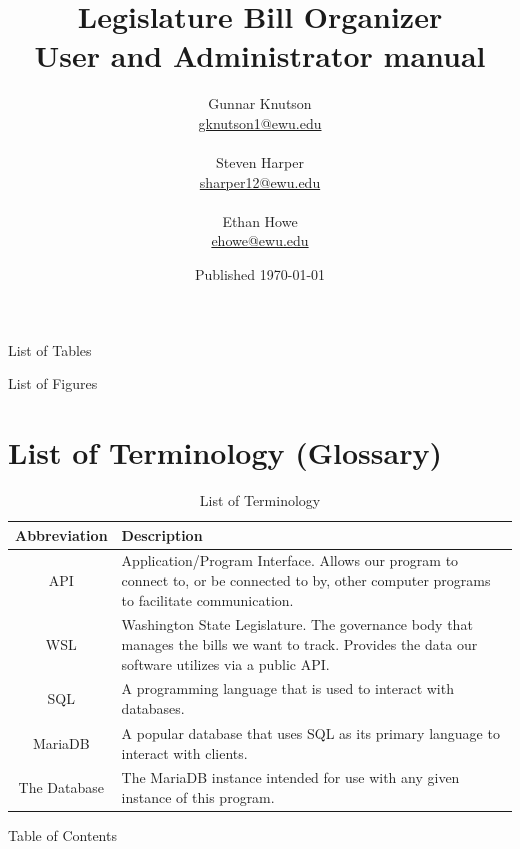 \documentclass{article}
\title{ \Huge Legislature Bill Organizer \\ \Large User and Administrator manual }
\author{
    Gunnar Knutson \\ \href{mailto://gknutson1@ewu.edu}{gknutson1@ewu.edu} \\ \\
    Steven Harper \\ \href{mailto://sharper12@ewu.edu}{sharper12@ewu.edu} \\ \\
    Ethan Howe \\ \href{mailto://ehowe@ewu.edu}{ehowe@ewu.edu} 
}
\date{Published \today}
\begin{document}
\maketitle
\pagebreak

\begin{table}[h]
    \listoftables
    \caption{List of Tables}
\end{table}

\begin{table}[h]
    \listoffigures
    \caption{List of Figures}
\end{table}

\section*{List of Terminology (Glossary)}
\begin{table}[h]
    \def\arraystretch{1.5} %
    \begin{tabularx}{\textwidth}{c X}
        \hline
        Abbreviation & Description \\ 
        \hline
        API & Application/Program Interface. Allows our program to connect to, or be connected to by, other computer programs to facilitate communication. \\
        \hline
        WSL & Washington State Legislature. The governance body that manages the bills we want to track. Provides the data our software utilizes via a public API. \\
        \hline
        SQL & A programming language that is used to interact with databases. \\
        \hline
        MariaDB & A popular database that uses SQL as its primary language to interact with clients. \\
        \hline
        The Database & The MariaDB instance intended for use with any given instance of this program. \\ 
        \hline
    \end{tabularx}
    \def\arraystretch{1}
    \caption{List of Terminology}
\end{table}
\pagebreak

\begin{table}[h]
    \tableofcontents
    \caption{Table of Contents}
\end{table}
\pagebreak
\end{document}
